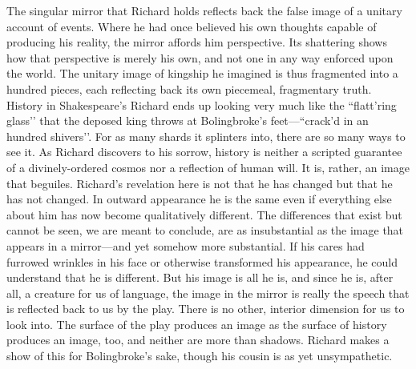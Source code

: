 The singular mirror that Richard holds reflects back the false image of a unitary account of events.
Where he had once believed his own thoughts capable of producing his reality, the mirror affords him perspective.
Its shattering shows how that perspective is merely his own, and not one in any way enforced upon the world.
The unitary image of kingship he imagined is thus fragmented into a hundred pieces, each reflecting back its own piecemeal, fragmentary truth.
History in Shakespeare’s Richard ends up looking very much like the ``flatt’ring glass’’ that the deposed king throws at Bolingbroke's feet---``crack’d in an hundred shivers’’.
For as many shards it splinters into, there are so many ways to see it.
As Richard discovers to his sorrow, history is neither a scripted guarantee of a divinely-ordered cosmos nor a reflection of human will.
It is, rather, an image that beguiles.
Richard’s revelation here is not that he has changed but that he has not changed.
In outward appearance he is the same even if everything else about him has now become qualitatively different.
The differences that exist but cannot be seen, we are meant to conclude, are as insubstantial as the image that appears in a mirror---and yet somehow more substantial.
If his cares had furrowed wrinkles in his face or otherwise transformed his appearance, he could understand that he is different.
But his image is all he is, and since he is, after all, a creature for us of language, the image in the mirror is really the speech that is reflected back to us by the play.
There is no other, interior dimension for us to look into.
The surface of the play produces an image as the surface of history produces an image, too, and neither are more than shadows.
Richard makes a show of this for Bolingbroke’s sake, though his cousin is as yet unsympathetic.

